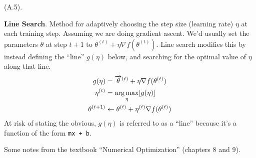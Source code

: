 \documentclass[11pt]{article}
\begin{document}
\myspace 
\p {} (A.5). 
\begin{compactitem}
	\item \textbf{Line Search}. Method for adaptively choosing the step size (learning rate) $\eta$ at each training step. Assuming we are doing gradient ascent. We'd usually set the parameters $\theta$ at step $t + 1$ to $\theta^{(t)} + \eta \nabla f(\theta^{(t)})$. Line search modifies this by instead defining the ``line'' $g(\eta)$ below, and searching for the optimal value of $\eta$ along that line.
	\begin{align}
		g(\eta) &= \overrightarrow{\theta}^{(t)} + \eta \nabla f(\theta^{(t)}) \\
		\eta^{(t)} &= \operatorname*{arg\,max}_{\eta}[ g(\eta) ] \\
		\theta^{(t + 1)} &\leftarrow \theta^{(t)} + \eta^{(t)} \nabla f(\theta^{(t)})
	\end{align}
	At risk of stating the obvious, $g(\eta)$ is referred to as a ``line'' because it's a function of the form \texttt{mx + b}. 
	
\end{compactitem}


Some notes from the textbook ``Numerical Optimization'' (chapters 8 and 9).
\end{document}

